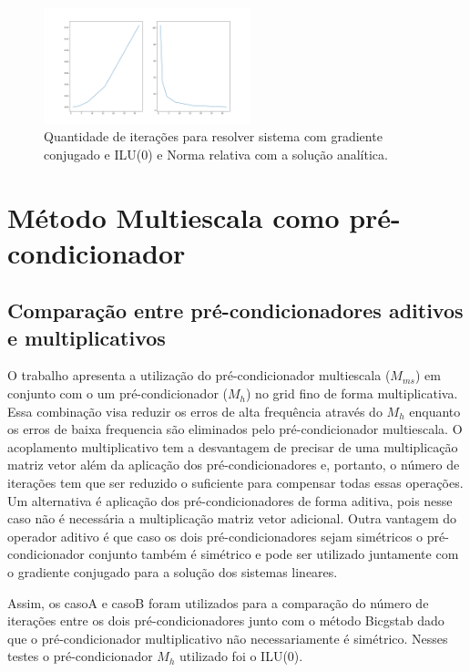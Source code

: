 \begin{figure}[!htbp]
    \label{fig:graficoHomogeneo}
    \centering
    \includegraphics[width=6cm]{chap08/figs/result_analiticos.png}
    \caption{Quantidade de iterações para resolver sistema com gradiente conjugado e ILU(0) e Norma relativa com a solução analítica.}
\end{figure}


\section{Método Multiescala como pré-condicionador}

\subsection{Comparação entre pré-condicionadores aditivos e multiplicativos}

O trabalho \cite{casteletto} apresenta a utilização do pré-condicionador multiescala ($M_{ms}$) em conjunto com o um pré-condicionador ($M_h$) no grid fino de forma multiplicativa. 
Essa combinação visa reduzir os erros de alta frequência através do $M_h$ enquanto os erros de baixa frequencia são eliminados pelo pré-condicionador multiescala. 
O acoplamento multiplicativo tem a desvantagem de precisar de uma multiplicação matriz vetor além da aplicação dos pré-condicionadores
e, portanto, o número de iterações tem que ser reduzido o suficiente para compensar todas essas operações. Um alternativa é aplicação
dos pré-condicionadores de forma aditiva, pois nesse caso não é necessária a multiplicação matriz vetor adicional. Outra vantagem do operador
aditivo é que caso os dois pré-condicionadores sejam simétricos o pré-condicionador conjunto também é simétrico e pode ser utilizado juntamente
com o gradiente conjugado para a solução dos sistemas lineares.


Assim, os casoA e casoB foram utilizados para a comparação do número de iterações entre os dois pré-condicionadores junto 
com o método Bicgstab dado que o pré-condicionador multiplicativo não necessariamente é simétrico. Nesses testes o pré-condicionador $M_h$ utilizado foi o ILU(0).

